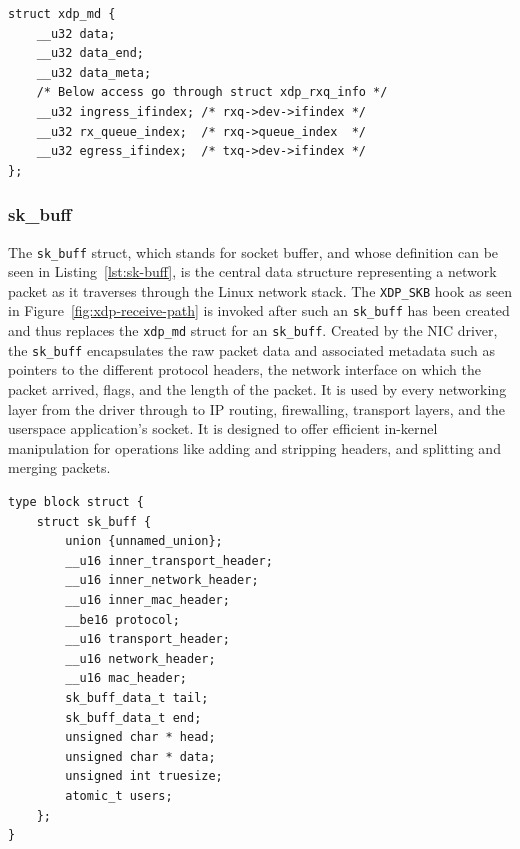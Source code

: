 \begin{lstlisting}[caption={The xdp\_md struct}, label={lst:xdp-md}]
struct xdp_md {
	__u32 data;
	__u32 data_end;
	__u32 data_meta;
	/* Below access go through struct xdp_rxq_info */
	__u32 ingress_ifindex; /* rxq->dev->ifindex */
	__u32 rx_queue_index;  /* rxq->queue_index  */
	__u32 egress_ifindex;  /* txq->dev->ifindex */
};
\end{lstlisting}

\subsubsection{sk\_buff}
\label{subsec:sk-buff}
The \texttt{sk\_buff} struct, which stands for socket buffer, and whose definition can be seen in Listing~\ref{lst:sk-buff}, is the central data structure representing a network packet as it traverses through the Linux network stack. The \texttt{XDP\_SKB} hook as seen in Figure~\ref{fig:xdp-receive-path} is invoked after such an \texttt{sk\_buff} has been created and thus replaces the \texttt{xdp\_md} struct for an \texttt{sk\_buff}. Created by the \ac{NIC} driver, the \texttt{sk\_buff} encapsulates the raw packet data and associated metadata such as pointers to the different protocol headers, the network interface on which the packet arrived, flags, and the length of the packet. It is used by every networking layer from the driver through to IP routing, firewalling, transport layers, and the userspace application's socket. It is designed to offer efficient in-kernel manipulation for operations like adding and stripping headers, and splitting and merging packets.

\begin{lstlisting}[caption={The sk\_buff struct}, label={lst:sk-buff}]
type block struct {
	struct sk_buff {
        union {unnamed_union};
        __u16 inner_transport_header;
        __u16 inner_network_header;
        __u16 inner_mac_header;
        __be16 protocol;
        __u16 transport_header;
        __u16 network_header;
        __u16 mac_header;
        sk_buff_data_t tail;
        sk_buff_data_t end;
        unsigned char * head;
        unsigned char * data;
        unsigned int truesize;
        atomic_t users;
    };  
}
\end{lstlisting}

